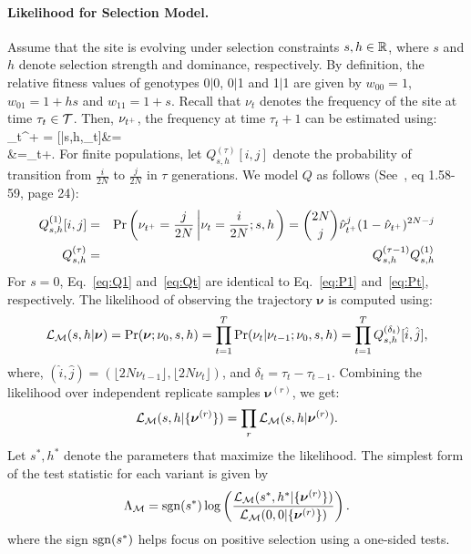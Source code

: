 \documentclass[11pt]{article}
\begin{document}
\paragraph{Likelihood for Selection Model.}
Assume that the site is evolving under selection constraints $s,h\in
{\mathbb R}$, where $s$ and $h$ denote selection strength and dominance,
respectively. By definition, the relative fitness values of genotypes
0$|$0, 0$|$1 and 1$|$1 are given by $w_{00}=1$, $w_{01}=1+hs$ and
$w_{11}=1+s$. Recall that $\nu_t$ denotes the frequency of the site at
time $\tau_t\in {\cal T}$. Then, $\nu_{t^+}$, the frequency at time
$\tau_t+1$ can be estimated using: \beq \hat{\nu}_{t^+} =
[\nusp|s,h,\nu_t]&=\\
&=\nu_t+.
  \label{eq:transition}
\eeq
For finite populations, let $Q^{(\tau)}_{s,h}[i,j]$ denote the
probability of transition from $\frac{i}{2N}$ to $\frac{j}{2N}$ in
$\tau$ generations. We model $Q$ as follows
(See~\cite{Ewens2012Mathematical}, eq 1.58-59, page 24):
\begin{eqnarray}
  Q^{(1)}_{s,h}[i,j] &=& \operatorname{Pr}\left(\nu_{t^+}=\frac{j}{2N} \left\lvert
      \nu_{t}=\frac{i}{2N};s,h \right .\right)={2N \choose j}
  \hat{\nu}_{t^+}^{j} (1-\hat{\nu}_{t^+})^{2N-j}\label{eq:Q1}\\
  Q^{(\tau)}_{s,h} &=& Q^{(\tau-1)}_{s,h}Q^{(1)}_{s,h}\label{eq:Qt}
  \label{eq:mkvs}   
\end{eqnarray}
For $s=0$, Eq.~\ref{eq:Q1} and~\ref{eq:Qt} are identical to
Eq.~\ref{eq:P1} and~\ref{eq:Pt}, respectively.  The likelihood of
observing the trajectory $\bm{\nu}$ is computed using:
\begin{equation}
  {\cal L}_{\cal M}(s,h|\bm{\nu}) = \operatorname{Pr}(\bm{\nu};\nu_0,s,h)=
  \prod_{t=1}^{T} \operatorname{Pr}(\nu_{t}|\nu_{t-1};\nu_0,s,h) = \prod_{t=1}^{T} Q^{(\delta_t)}_{s,h}[\hat{i},\hat{j}],
\end{equation}
where, $(\hat{i},\hat{j})=(\lfloor 2N\nu_{t-1}\rfloor, \lfloor
2N\nu_{t}\rfloor)$, and $\delta_t=\tau_{t}-\tau_{t-1}$. Combining the
likelihood over independent replicate samples $\bm{\nu}^{(r)}$, we
get:
\begin{equation}
  {\cal L}_{\cal M}(s,h|\{\bm{\nu}^{(r)}\}) = \prod_r   {\cal L}_{\cal M}(s,h|\bm{\nu}^{(r)}).
  \label{eq:mkvlik}
\end{equation}
Let $s^*,h^*$ denote the parameters that maximize the likelihood. The
simplest form of the test statistic for each variant is given by
\begin{eqnarray}
\Lambda_{\cal M}= \operatorname{sgn}(s^*)\log 
\left(\frac{{\cal L}_{\cal M}(s^*,h^*|\{\bm{\nu}^{(r)}\})}{{\cal L}_{\cal M}(0,0|\{\bm{\nu}^{(r)}\})}\right).
\label{eq:mcts}
\end{eqnarray}
where the sign $\operatorname{sgn}(s^*)$ helps focus on positive selection using a
one-sided tests.  
\end{document}
